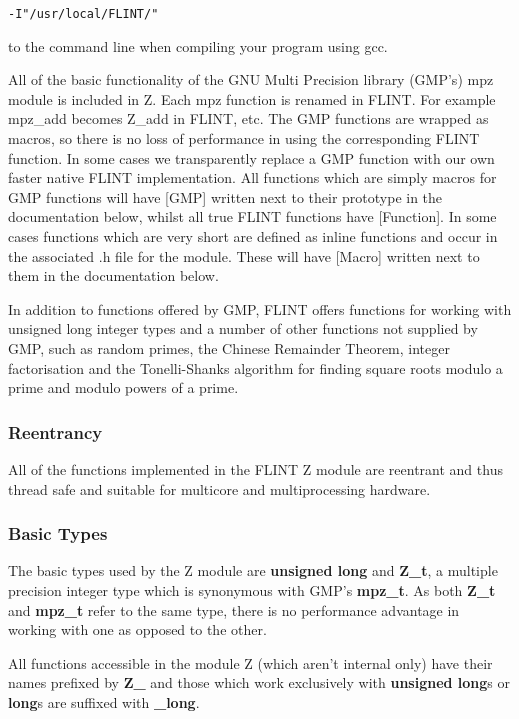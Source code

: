 \documentclass[a4paper,10pt]{article}
\begin{document}
\begin{verbatim}-I"/usr/local/FLINT/"\end{verbatim}

to the command line when compiling your program using gcc.

All of the basic functionality of the GNU Multi Precision library (GMP's) mpz module is included in Z. Each mpz function is renamed in FLINT. For example mpz\_add becomes Z\_add in FLINT, etc. The GMP functions are wrapped as macros, so there is no loss of performance in using the corresponding FLINT function. In some cases we transparently replace a GMP function with our own faster native FLINT implementation. All functions which are simply macros for GMP functions will have [GMP] written next to their prototype in the documentation below, whilst all true FLINT functions have [Function]. In some cases functions which are very short are defined as inline functions and occur in the associated .h file for the module. These will have [Macro] written next to them in the documentation below.

In addition to functions offered by GMP, FLINT offers functions for working with unsigned long integer types and a number of other functions not supplied by GMP, such as random primes, the Chinese Remainder Theorem, integer factorisation and the Tonelli-Shanks algorithm for finding square roots modulo a prime and modulo powers of a prime. 

\subsubsection{Reentrancy}
All of the functions implemented in the FLINT Z module are reentrant and thus thread safe and suitable for multicore and multiprocessing hardware.

\subsubsection{Basic Types}
The basic types used by the Z module are \textbf{unsigned long} and \textbf{Z\_t}, a multiple precision integer type which is synonymous with GMP's \textbf{mpz\_t}. As both \textbf{Z\_t} and \textbf{mpz\_t} refer to the same type, there is no performance advantage in working with one as opposed to the other.

All functions accessible in the module Z (which aren't internal only) have their names prefixed by \textbf{Z\_} and those which work exclusively with \textbf{unsigned long}s or \textbf{long}s are suffixed with \textbf{\_long}. 
\end{document}
